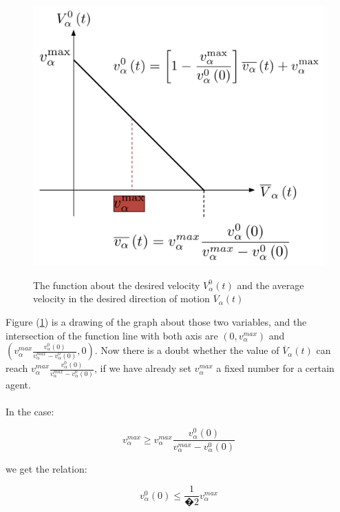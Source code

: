 \begin{figure}
\centering
{\includegraphics[scale=0.45]{Figures/impatience.pdf}} 
\caption{\small{The function about the desired velocity $ V_{\alpha}^{0}(t) $ 
and the average velocity in the desired direction of motion $ \overline{V}_{\alpha} \left( t \right) $}}
\label{impatience}
\end{figure}

Figure (\ref{impatience}) is a drawing of the graph about those two variables, and the intersection
 of the function line with both axis are $ (0, v_{\alpha}^{max}) $ and $(v_{\alpha}^{max}\frac{v_{\alpha}^{0}(0)}{v_{\alpha}^{max}-v_{\alpha}^{0}(0)}, 0) $. Now there is a 
doubt whether the value of $ \overline{V}_{\alpha} \left( t \right) $ can reach $ v_{\alpha}^{max}\frac{v_{\alpha}^{0}(0)}{v_{\alpha}^{max}-v_{\alpha}^{0}(0)} $, if we have already 
set $ v_{\alpha}^{max} $ a fixed number for a certain agent.\\\\

In the case:

\begin{equation}
 v_{\alpha}^{max} \geq v_{\alpha}^{max}\frac{v_{\alpha}^{0}(0)}{v_{\alpha}^{max}-v_{\alpha}^{0}(0)}
\end{equation}

we get the relation:

\begin{equation}
v_{\alpha}^{0}(0)\leq \frac{1}{�2}v_{\alpha}^{max}
\end{equation}

